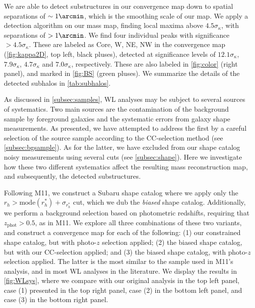 \documentclass[iop,twocolumn]{emulateapj}
\begin{document}
We are able to detect substructures in our convergence map down to spatial separations of $\sim1\arcmin$, which is the smoothing scale of our map. We apply a detection algorithm on our mass map, finding local maxima above $4.5\sigma_\kappa$, with separations of $>1\arcmin$. We find four individual peaks with significance $>4.5\sigma_\kappa$. These are labeled as Core, W, NE, NW in the convergence map (\autoref{fig:kappa2D}, top left, black pluses), detected at significance levels of $12.1\sigma_\kappa$, $7.9\sigma_\kappa$, $4.7\sigma_\kappa$ and  $7.0\sigma_\kappa$, respectively. These are also labeled in \autoref{fig:color} (right panel), and marked in \autoref{fig:BS} (green pluses). We summarize the details of the detected subhalos in \autoref{tab:subhalos}.

As discussed in \autoref{subsec:samples}, WL analyses may be subject to
several sources of systematics. Two main sources are the contamination
of the background sample by foreground galaxies and the systematic
errors from galaxy shape measurements. As presented, we have attempted to address the first by a careful selection of the source sample according to the CC-selection method (see \autoref{subsec:bgsample}). As for the latter, we have excluded from our shape catalog noisy measurements using several cuts (see \autoref{subsec:shape}). Here we investigate how these two different systematics affect the resulting mass reconstruction map, and subsequently, the detected substructures.

Following M11, we construct a Subaru shape catalog where we apply only the
$r_h>\mathrm{mode}(r_h^*)+\sigma_{r_h^*}$ cut, which we dub the {\em biased} shape catalog. Additionally, we perform a background selection based on photometric redshifts, requiring that $z_\mathrm{phot}>0.5$, as in M11. We explore all three combinations of these two variants, and construct a convergence map for each of the following: (1) 
our constrained shape catalog, but with photo-$z$ selection applied; (2) the biased shape catalog, but with our CC-selection applied; and (3) the biased shape catalog, with photo-$z$ selection applied. The latter is the most similar to the sample used in M11's analysis, and in most WL analyses in the literature. We display the results in \autoref{fig:WLsys}, where we compare with our original analysis in the top left panel, case (1) presented in the top right panel, case (2) in the bottom left panel, and case (3) in the bottom right panel.
\end{document}

